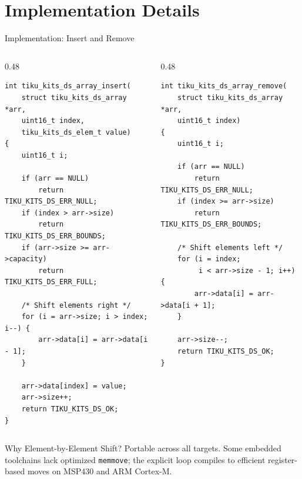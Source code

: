 \documentclass[aspectratio=169, 10pt]{beamer}
\begin{document}
\section{Implementation Details}

\begin{frame}[fragile]{Implementation: Insert and Remove}
\begin{columns}[T]
\begin{column}{0.48\textwidth}
\begin{lstlisting}[style=cstyle,
  title={insert --- shift right to make room}]
int tiku_kits_ds_array_insert(
    struct tiku_kits_ds_array *arr,
    uint16_t index,
    tiku_kits_ds_elem_t value)
{
    uint16_t i;

    if (arr == NULL)
        return TIKU_KITS_DS_ERR_NULL;
    if (index > arr->size)
        return TIKU_KITS_DS_ERR_BOUNDS;
    if (arr->size >= arr->capacity)
        return TIKU_KITS_DS_ERR_FULL;

    /* Shift elements right */
    for (i = arr->size; i > index; i--) {
        arr->data[i] = arr->data[i - 1];
    }

    arr->data[index] = value;
    arr->size++;
    return TIKU_KITS_DS_OK;
}
\end{lstlisting}
\end{column}

\begin{column}{0.48\textwidth}
\begin{lstlisting}[style=cstyle,
  title={remove --- shift left to fill gap}]
int tiku_kits_ds_array_remove(
    struct tiku_kits_ds_array *arr,
    uint16_t index)
{
    uint16_t i;

    if (arr == NULL)
        return TIKU_KITS_DS_ERR_NULL;
    if (index >= arr->size)
        return TIKU_KITS_DS_ERR_BOUNDS;

    /* Shift elements left */
    for (i = index;
         i < arr->size - 1; i++) {
        arr->data[i] = arr->data[i + 1];
    }

    arr->size--;
    return TIKU_KITS_DS_OK;
}
\end{lstlisting}
\end{column}
\end{columns}

\vspace{0.3em}
\begin{block}{Why Element-by-Element Shift?}
Portable across all targets. Some embedded toolchains lack optimized
\texttt{memmove}; the explicit loop compiles to efficient register-based
moves on MSP430 and ARM Cortex-M.
\end{block}
\end{frame}
\end{document}
